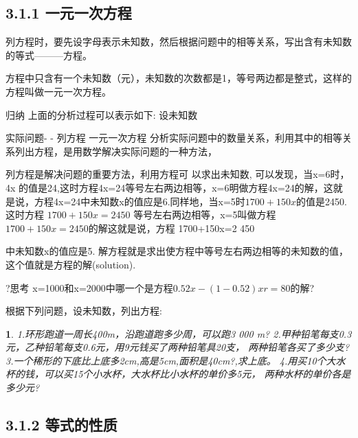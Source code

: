 \documentclass[11pt]{article}
\newtheorem{exercise}{ }
\begin{document}

\subsection*{3.1.1 一元一次方程}


	\begin{definition}
	列方程时，要先设字母表示未知数，然后根据问题中的相等关系，写出含有未知数的等式———方程。
	\end{definition}

	\begin{definition}
	方程中只含有一个未知数（元），未知数的次数都是1，等号两边都是整式，这样的方程叫做一元一次方程。
	\end{definition}



归纳
上面的分析过程可以表示如下:
设未知数

实际问题- -
列方程
一元一次方程
分析实际问题中的数量关系，利用其中的相等关系列出方程，是用数学解决实际问题的一种方法，

列方程是解决问题的重要方法，利用方程可  以求出未知数,
可以发现，当x=6时，4x 的值是24,这时方程4x=24等号左右两边相等，x=6明做方程4x=24的解，这就是说，方程4x=24中未知数x的值应是6.同样地，当x=5时$1700+150x$的值是2450. 这时方程
$1700+150x=2450$
等号左右两边相等，x=5叫做方程$1700+150x=2450$的解这就是说，方程
1700+150x=2 450

中未知数x的值应是5.
解方程就是求出使方程中等号左右两边相等的未知数的值，这个值就是方程的解(solution).

?思考
x=1000和x=2000中哪一个是方程$0.52x- (1- 0. 52)xr= 80$的解?

根据下列问题，设未知数，列出方程:
\begin{exercise}
1.环形跑道一周长400m，沿跑道跑多少周，可以跑3 000 m?
2.甲种铅笔每支0.3元，乙种铅笔每支0.6元，用9元钱买了两种铅笔具20支，
两种铅笔各买了多少支?
3.一个稀形的下底比上底多2cm,高是5cm,面积是40cm?,求上底。
4.用买10个大水杯的钱，可以买15个小水杯，大水杯比小水杯的单价多5元，
两种水杯的单价各是多少元?
\end{exercise}


\subsection*{3.1.2 等式的性质}
\end{document}
